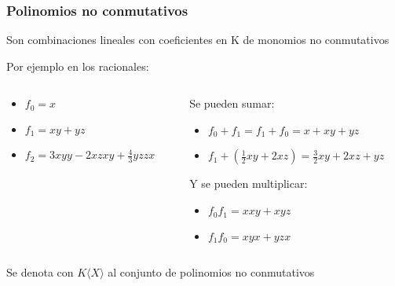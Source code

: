 \documentclass[spanish, aspectratio=169, hidecontrols]{beamer}
\begin{document}
\begin{frame}
  \frametitle{Polinomios no conmutativos}
  Son combinaciones lineales con coeficientes en K de monomios no conmutativos
  \pause
  \begin{exampleblock}{Por ejemplo en los racionales:}
    \begin{columns}
      \begin{column}{0.5\textwidth}
        \begin{itemize}
          \item $f_0 = x$
          \item $f_1 = xy + yz$
          \item $f_2 = 3 xyy - 2 xzxy + \frac{4}{3} yzzx$
        \end{itemize}
      \end{column}
      \begin{column}{0.5\textwidth}
        \pause
        Se pueden sumar:
        \begin{itemize}
          \item $f_0 + f_1 = f_1 + f_0 = x + xy + yz$
          \item $f_1 + (\frac{1}{2}xy + 2 xz) = \frac{3}{2} xy + 2 xz + yz$
        \end{itemize}
        \pause
        Y se pueden multiplicar:
        \begin{itemize}
          \item $f_0 f_1 = xxy + xyz$
          \item $f_1 f_0 = xyx + yzx$
        \end{itemize}
      \end{column}
    \end{columns}
  \end{exampleblock}

  \pause

  Se denota con $K⟨X⟩$ al conjunto de polinomios no conmutativos
\end{frame}


\end{document}
